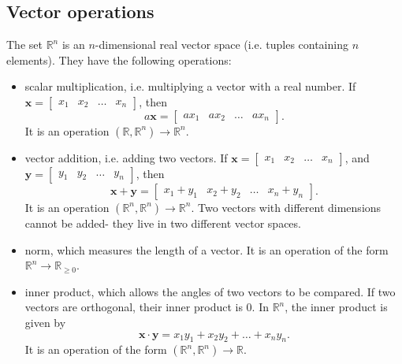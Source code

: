 \documentclass[a4paper, openany]{memoir}
\begin{document}
    \subsection{Vector operations}
    The set $\mathbb{R}^n$ is an $n$-dimensional real vector space (i.e. tuples containing $n$ elements). They have the following operations:
    \begin{itemize}
        \item scalar multiplication, i.e. multiplying a vector with a real number. If $\mathbf{x} = \begin{bmatrix}
            x_1 & x_2 & \dots & x_n
        \end{bmatrix}$, then
        \[a \mathbf{x} = \begin{bmatrix}
            ax_1 & ax_2 & \dots & ax_n
        \end{bmatrix}.\]
        It is an operation $(\mathbb{R}, \mathbb{R}^n) \to \mathbb{R}^n$.
        
        \item vector addition, i.e. adding two vectors. If $\mathbf{x} = \begin{bmatrix}
            x_1 & x_2 & \dots & x_n
        \end{bmatrix}$, and $\mathbf{y} = \begin{bmatrix}
            y_1 & y_2 & \dots & y_n
        \end{bmatrix}$, then
        \[\mathbf{x} + \mathbf{y} = \begin{bmatrix}
            x_1 + y_1 & x_2 + y_2 & \dots & x_n + y_n
        \end{bmatrix}.\]
        It is an operation $(\mathbb{R}^n, \mathbb{R}^n) \to \mathbb{R}^n$. Two vectors with different dimensions cannot be added- they live in two different vector spaces.

        \item norm, which measures the length of a vector. It is an operation of the form $\mathbb{R}^n \to \mathbb{R}_{\geqslant 0}$.
        
        \item inner product, which allows the angles of two vectors to be compared. If two vectors are orthogonal, their inner product is 0. In $\mathbb{R}^n$, the inner product is given by
        \[\mathbf{x} \cdot \mathbf{y} = x_1 y_1 + x_2 y_2 + \dots + x_n y_n.\]
        It is an operation of the form $(\mathbb{R}^n, \mathbb{R}^n) \to \mathbb{R}$.
    \end{itemize}
    
\end{document}
